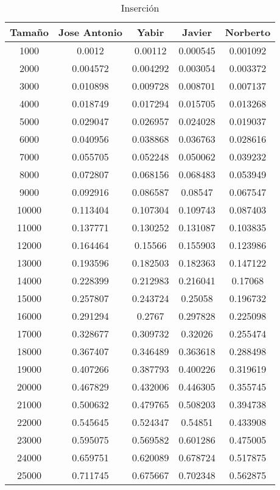 \documentclass{article}
\begin{document}
\newpage

\begin{table}[h]
	\centering
	\caption{Inserción}
\begin{tabular}{ | c | c  | c | c | c | }
  \hline
   Tama\~no & Jose Antonio & Yabir & Javier & Norberto\\ 
   \hline
1000	&	0.0012	&	0.00112	&	0.000545	&	0.001092	\\
2000	&	0.004572	&	0.004292	&	0.003054	&	0.003372	\\
3000	&	0.010898	&	0.009728	&	0.008701	&	0.007137	\\
4000	&	0.018749	&	0.017294	&	0.015705	&	0.013268	\\
5000	&	0.029047	&	0.026957	&	0.024028	&	0.019037	\\
6000	&	0.040956	&	0.038868	&	0.036763	&	0.028616	\\
7000	&	0.055705	&	0.052248	&	0.050062	&	0.039232	\\
8000	&	0.072807	&	0.068156	&	0.068483	&	0.053949	\\
9000	&	0.092916	&	0.086587	&	0.08547	&	0.067547	\\
10000	&	0.113404	&	0.107304	&	0.109743	&	0.087403	\\
11000	&	0.137771	&	0.130252	&	0.131087	&	0.103835	\\
12000	&	0.164464	&	0.15566	&	0.155903	&	0.123986	\\
13000	&	0.193596	&	0.182503	&	0.182363	&	0.147122	\\
14000	&	0.228399	&	0.212983	&	0.216041	&	0.17068	\\
15000	&	0.257807	&	0.243724	&	0.25058	&	0.196732	\\
16000	&	0.291294	&	0.2767	&	0.297828	&	0.225098	\\
17000	&	0.328677	&	0.309732	&	0.32026	&	0.255474	\\
18000	&	0.367407	&	0.346489	&	0.363618	&	0.288498	\\
19000	&	0.407266	&	0.387793	&	0.400226	&	0.319619	\\
20000	&	0.467829	&	0.432006	&	0.446305	&	0.355745	\\
21000	&	0.500632	&	0.479765	&	0.508203	&	0.394738	\\
22000	&	0.545645	&	0.524347	&	0.54851	&	0.433908	\\
23000	&	0.595075	&	0.569582	&	0.601286	&	0.475005	\\
24000	&	0.659751	&	0.620089	&	0.678724	&	0.517875	\\
25000	&	0.711745	&	0.675667	&	0.702348	&	0.562875	\\
\hline
\end{tabular}
\end{table}
\end{document}
